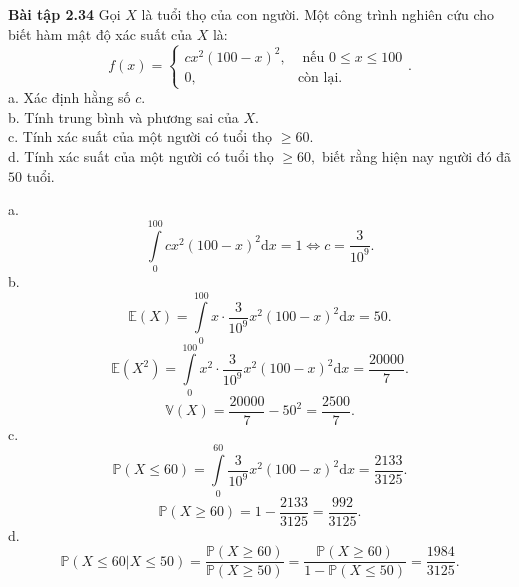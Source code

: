 \documentclass[12pt,a4paper]{article}
\begin{document}
\begin{mybox}
    \textbf{Bài tập 2.34} Gọi $X$ là tuổi thọ của con người. Một công trình nghiên cứu cho biết hàm mật độ xác suất của $X$ là:
    $$f \left( x \right) = 
    \begin{cases}
        cx^2 \left( {100 - x} \right)^2, &\text{ nếu } 0 \leqslant x \leqslant 100\\
        0, &\text{còn lại.}
    \end{cases}
    .$$
    a. Xác định hằng số $c.$\\
    b. Tính trung bình và phương sai của $X.$\\
    c. Tính xác suất của một người có tuổi thọ $\geqslant 60.$\\
    d. Tính xác suất của một người có tuổi thọ $\geqslant 60,$ biết rằng hiện nay người đó đã $50$ tuổi.
\end{mybox}
a. $$\int\limits_{0}^{100}{cx^2\left( {100 - x} \right)^2 \mathrm{d}x} = 1 \Leftrightarrow c = \frac{3}{10^9}.$$
b. $$\mathbb{E} \left( X \right) = \int\limits_{0}^{100}{x \cdot \frac{3}{10^9} x^2 \left( {100 - x} \right)^2 \mathrm{d}x} = 50.$$
$$\mathbb{E} \left( {X^2} \right) = \int\limits_{0}^{100}{x^2 \cdot \frac{3}{10^9} x^2 \left( {100 - x} \right)^2\mathrm{d}x} = \frac{20000}{7}.$$
$$\mathbb{V} \left( X \right) = \frac{20000}{7} - 50^2 = \frac{2500}{7}.$$
c. $$\mathbb{P} \left( X \leqslant 60 \right) = \int\limits_{0}^{60}{\frac{3}{10^9} x^2 \left( {100 - x} \right)^2\mathrm{d}x} = \frac{2133}{3125}.$$
$$\mathbb{P} \left( X \geqslant 60 \right) = 1 - \frac{2133}{3125} = \frac{992}{3125}.$$
d. $$\mathbb{P} \left( {\left. X \leqslant 60 \right| X \leqslant 50} \right) = \frac{\mathbb{P} \left( X \geqslant 60 \right)}{\mathbb{P} \left( X \geqslant 50 \right)} = \frac{\mathbb{P} \left( X \geqslant 60 \right)}{1 - \mathbb{P} \left( X \leqslant 50 \right)} = \frac{1984}{3125}.$$
\end{document}
